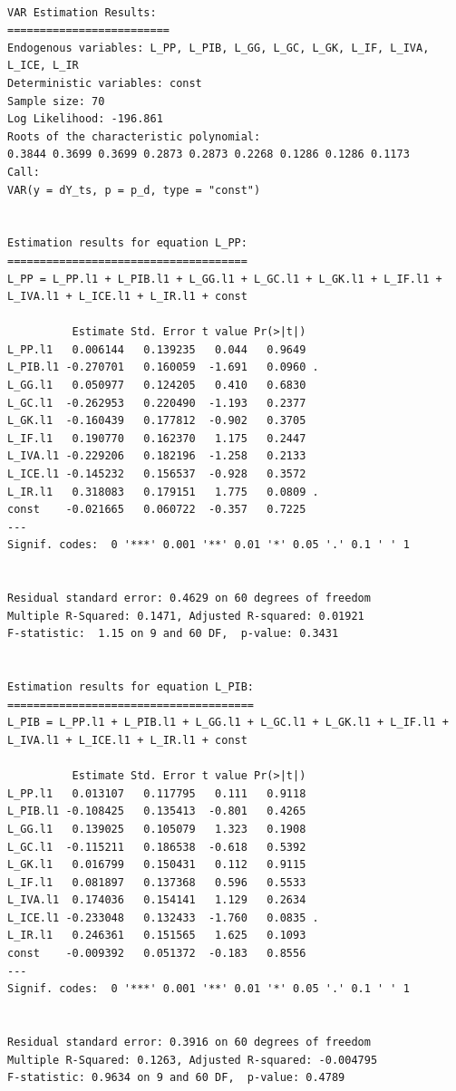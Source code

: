 \documentclass[
  spanish,
  letterpaper,
  DIV=11,
  numbers=noendperiod]{scrartcl}
\begin{document}
\begin{verbatim}

VAR Estimation Results:
========================= 
Endogenous variables: L_PP, L_PIB, L_GG, L_GC, L_GK, L_IF, L_IVA, L_ICE, L_IR 
Deterministic variables: const 
Sample size: 70 
Log Likelihood: -196.861 
Roots of the characteristic polynomial:
0.3844 0.3699 0.3699 0.2873 0.2873 0.2268 0.1286 0.1286 0.1173
Call:
VAR(y = dY_ts, p = p_d, type = "const")


Estimation results for equation L_PP: 
===================================== 
L_PP = L_PP.l1 + L_PIB.l1 + L_GG.l1 + L_GC.l1 + L_GK.l1 + L_IF.l1 + L_IVA.l1 + L_ICE.l1 + L_IR.l1 + const 

          Estimate Std. Error t value Pr(>|t|)  
L_PP.l1   0.006144   0.139235   0.044   0.9649  
L_PIB.l1 -0.270701   0.160059  -1.691   0.0960 .
L_GG.l1   0.050977   0.124205   0.410   0.6830  
L_GC.l1  -0.262953   0.220490  -1.193   0.2377  
L_GK.l1  -0.160439   0.177812  -0.902   0.3705  
L_IF.l1   0.190770   0.162370   1.175   0.2447  
L_IVA.l1 -0.229206   0.182196  -1.258   0.2133  
L_ICE.l1 -0.145232   0.156537  -0.928   0.3572  
L_IR.l1   0.318083   0.179151   1.775   0.0809 .
const    -0.021665   0.060722  -0.357   0.7225  
---
Signif. codes:  0 '***' 0.001 '**' 0.01 '*' 0.05 '.' 0.1 ' ' 1


Residual standard error: 0.4629 on 60 degrees of freedom
Multiple R-Squared: 0.1471, Adjusted R-squared: 0.01921 
F-statistic:  1.15 on 9 and 60 DF,  p-value: 0.3431 


Estimation results for equation L_PIB: 
====================================== 
L_PIB = L_PP.l1 + L_PIB.l1 + L_GG.l1 + L_GC.l1 + L_GK.l1 + L_IF.l1 + L_IVA.l1 + L_ICE.l1 + L_IR.l1 + const 

          Estimate Std. Error t value Pr(>|t|)  
L_PP.l1   0.013107   0.117795   0.111   0.9118  
L_PIB.l1 -0.108425   0.135413  -0.801   0.4265  
L_GG.l1   0.139025   0.105079   1.323   0.1908  
L_GC.l1  -0.115211   0.186538  -0.618   0.5392  
L_GK.l1   0.016799   0.150431   0.112   0.9115  
L_IF.l1   0.081897   0.137368   0.596   0.5533  
L_IVA.l1  0.174036   0.154141   1.129   0.2634  
L_ICE.l1 -0.233048   0.132433  -1.760   0.0835 .
L_IR.l1   0.246361   0.151565   1.625   0.1093  
const    -0.009392   0.051372  -0.183   0.8556  
---
Signif. codes:  0 '***' 0.001 '**' 0.01 '*' 0.05 '.' 0.1 ' ' 1


Residual standard error: 0.3916 on 60 degrees of freedom
Multiple R-Squared: 0.1263, Adjusted R-squared: -0.004795 
F-statistic: 0.9634 on 9 and 60 DF,  p-value: 0.4789 



\end{verbatim}
\end{document}
